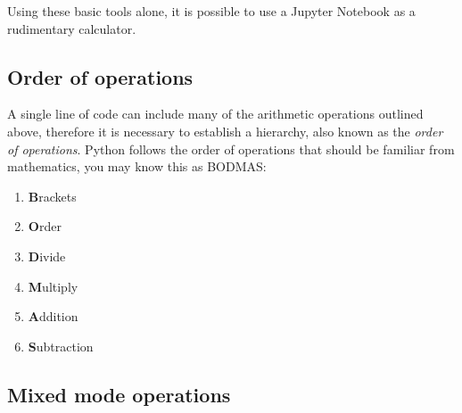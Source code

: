 \documentclass[a4paper]{article}
\begin{document}
Using these basic tools alone, it is possible to use a Jupyter Notebook as a rudimentary calculator.

\subsection{Order of operations}

A single line of code can include many of the arithmetic operations outlined above, therefore it is necessary to establish a hierarchy, also known as the \emph{order of operations}.
Python follows the order of operations that should be familiar from mathematics, you may know this as BODMAS:
\begin{enumerate}
	\item{\textbf{B}rackets}
	\item{\textbf{O}rder}
	\item{\textbf{D}ivide}
	\item{\textbf{M}ultiply}
	\item{\textbf{A}ddition}
	\item{\textbf{S}ubtraction}
\end{enumerate}
\vspace{\baselineskip}
\begin{center}
	\noindent{}
\end{center}

\subsection{Mixed mode operations}
\end{document}
